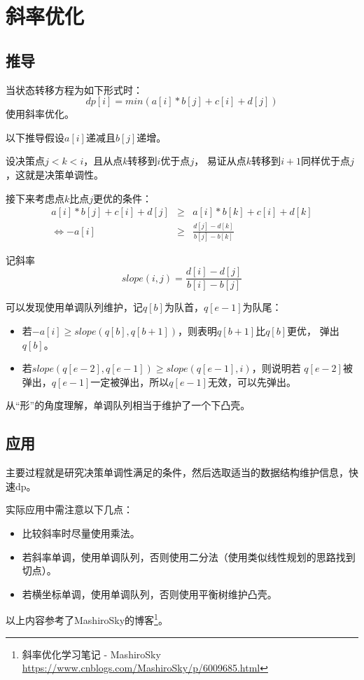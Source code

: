 \section{斜率优化}
\subsection{推导}
当状态转移方程为如下形式时：
\begin{displaymath}
    dp[i]=min(a[i]*b[j]+c[i]+d[j])
\end{displaymath}
使用斜率优化。

以下推导假设$a[i]$递减且$b[j]$递增。

设决策点$j<k<i$，且从点$k$转移到$i$优于点$j$，
易证从点$k$转移到$i+1$同样优于点$j$，这就是决策单调性。

接下来考虑点$k$比点$j$更优的条件：
\begin{eqnarray*}
    a[i]*b[j]+c[i]+d[j]&\geq&a[i]*b[k]+c[i]+d[k]\\
    \Leftrightarrow -a[i]&\geq&\frac{d[j]-d[k]}{b[j]-b[k]}
\end{eqnarray*}

记斜率
\begin{displaymath}
    slope(i,j)=\frac{d[i]-d[j]}{b[i]-b[j]}
\end{displaymath}

可以发现使用单调队列维护，记$q[b]$为队首，$q[e-1]$为队尾：
\begin{itemize}
    \item 若$-a[i]\geq slope(q[b],q[b+1])$，则表明$q[b+1]$比$q[b]$更优，
    弹出$q[b]$。
    \item 若$slope(q[e-2],q[e-1])\geq slope(q[e-1],i)$，则说明若
    $q[e-2]$被弹出，$q[e-1]$一定被弹出，所以$q[e-1]$无效，可以先弹出。
\end{itemize}

从``形''的角度理解，单调队列相当于维护了一个下凸壳。
\subsection{应用}
主要过程就是研究决策单调性满足的条件，然后选取适当的数据结构维护信息，快速dp。

实际应用中需注意以下几点：
\begin{itemize}
    \item 比较斜率时尽量使用乘法。
    \item 若斜率单调，使用单调队列，否则使用二分法（使用类似线性规划的思路找到切点）。
    \item 若横坐标单调，使用单调队列，否则使用平衡树维护凸壳。
\end{itemize}

以上内容参考了MashiroSky的博客\footnote{斜率优化学习笔记 - MashiroSky
    \url{https://www.cnblogs.com/MashiroSky/p/6009685.html}
}。
